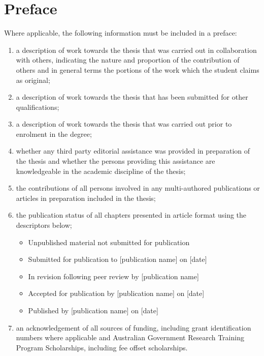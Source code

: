 {}

\begingroup

\let\clearpage\relax
\let\cleardoublepage\relax
\let\cleardoublepage\relax

\chapter*{Preface}

Where applicable, the following information must be included in a preface:
\begin{enumerate}
    \item a description of work towards the thesis that was carried out in collaboration with others, indicating the nature and proportion of the contribution of others and in general terms the portions of the work which the student claims as original;
    \item a description of work towards the thesis that has been submitted for other qualifications;
    \item a description of work towards the thesis that was carried out prior to enrolment in the degree;
    \item whether any third party editorial assistance was provided in preparation of the thesis and whether the persons providing this assistance are knowledgeable in the academic discipline of the thesis;
    \item the contributions of all persons involved in any multi-authored publications or articles in preparation included in the thesis;
    \item the publication status of all chapters presented in article format using the descriptors below;
    \begin{itemize}
        \item Unpublished material not submitted for publication
        \item Submitted for publication to [publication name] on [date]
        \item In revision following peer review by [publication name]
        \item Accepted for publication by [publication name] on [date]
        \item Published by [publication name] on [date]
    \end{itemize}
    \item an acknowledgement of all sources of funding, including grant identification numbers where applicable and Australian Government Research Training Program Scholarships, including fee offset scholarships.
\end{enumerate}


\vfill

\endgroup

\vfill
